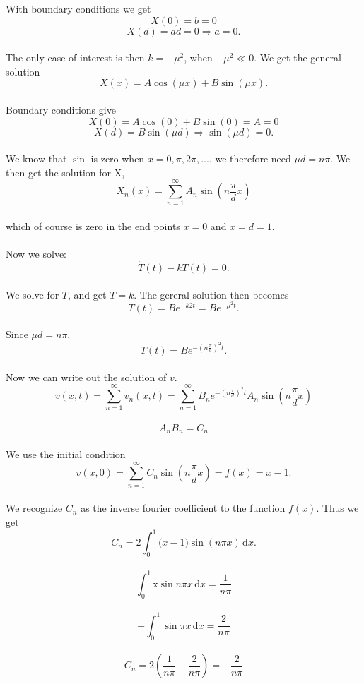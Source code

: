 \documentclass[a4paper,12pt, english]{article}
\begin{document}
With boundary conditions we get
\\
$$X(0) = b = 0$$
$$X(d) = ad = 0 \Rightarrow a = 0.$$
\\
The only case of interest is then $k = -\mu^2$, when $-\mu^2 \ll 0$. We get the general solution
\\
$$X(x) = A\cos(\mu x) + B\sin(\mu x).$$
\\
Boundary conditions give
\\
$$X(0) = A\cos(0) + B\sin(0) = A = 0$$
$$X(d) = B\sin(\mu d) \Rightarrow \sin(\mu d) = 0.$$
\\
We know that $\sin$ is zero when $x  = 0, \pi, 2\pi,...$, we therefore need $\mu d = n \pi$. We then get the solution for X,
\\
$$X_n(x) = \sum_{n=1}^{\infty} A_n \sin\left(n\frac{\pi}{d} x\right)$$ 
\\
which of course is zero in the end points $x = 0$ and $x = d = 1$.
\\
\\
Now we solve:
\\
$$\dot{T}(t) - kT(t) = 0.$$
\\
We solve for $T$, and get $T = k$. The gereral solution then becomes
\\
$$T(t) = Be^{-k2 t} = Be^{-\mu^2 t}.$$
\\
Since $\mu d = n \pi$,
\\
$$T(t) = Be^{-\left( n \frac{\pi}{d}\right)^2 t}.$$
\\
Now we can write out the solution of $v$. 
\\
$$v(x,t) = \sum_{n=1}^{\infty}v_n(x,t) =
\sum_{n=1}^{\infty} B_n e^{-\left( n \frac{\pi}{d}\right)^2 t} A_n \sin\left(n\frac{\pi}{d} x\right)$$
\\
$$A_nB_n = C_n$$
\\
We use the initial condition 
\\
$$v(x,0) = \sum_{n=1}^{\infty} C_n \sin\left(n\frac{\pi}{d} x\right) = f(x) = x -1.$$
\\
We recognize $C_n$ as the inverse fourier coefficient to the function $f(x)$.
Thus we get
\\
$$C_n = 2\int_0^1 \mathrm(x - 1)\sin (n\pi x)\,\mathrm{d}x.$$
\\
$$\int_0^1 \mathrm x \sin n \pi x\,\mathrm{d}x = \frac{1}{n\pi}$$
\\
$$-\int_0^1 \mathrm \sin \pi x\,\mathrm{d}x = \frac{2}{n \pi}$$
\\
$$C_n = 2 \left(\frac{1}{n\pi} - \frac{2}{n\pi} \right) = -\frac{2}{n\pi}$$
\\
\end{document}
